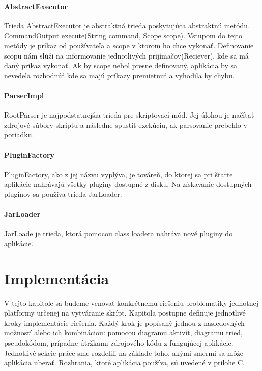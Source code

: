 \paragraph{AbstractExecutor}
Trieda AbstractExecutor je abstraktná trieda poskytujúca abstraktnú metódu,  CommandOutput execute(String command, Scope scope). Vstupom do tejto metódy je príkaz od používateľa a scope v ktorom ho chce vykonať. Definovanie scopu nám slúži na informovanie jednotlivých prijímačov(Reciever), kde sa má daný príkaz vykonať. Ak by scope nebol presne definovaný, aplikácia by sa nevedela rozhodnúť kde sa majú príkazy premietnuť a vyhodila by chybu.
\paragraph{ParserImpl}
RootParser je najpodstatnejšia trieda pre skriptovací mód. Jej úlohou je načítať zdrojové súbory skriptu a následne spustiť exekúciu, ak parsovanie prebehlo v poriadku.
\paragraph{PluginFactory}
PluginFactory, ako z jej názvu vyplýva, je továreň, do ktorej sa pri štarte aplikácie nahrávajú všetky pluginy dostupné z disku. Na získavanie dostupných pluginov sa používa trieda JarLoader. 
\paragraph{JarLoader}
JarLoade je trieda, ktorá pomocou class loadera nahráva nové pluginy do aplikácie.
\section{Implementácia}
\indent V tejto kapitole sa budeme venovať konkrétnemu riešeniu problematiky jednotnej platformy určenej na vytváranie skrípt. Kapitola postupne definuje jednotlivé kroky implementácie riešenia. Každý krok je popísaný jednou z nasledovných možností alebo ich kombináciou: pomocou diagramu aktivít, diagramu tried, pseudokódom, prípadne útržkami zdrojového kódu z fungujúcej aplikácie. Jednotlivé sekcie práce sme rozdelili na základe toho, akými smermi sa môže aplikácia uberať. Rozhrania, ktoré aplikácia používa, sú uvedené v prílohe C.
